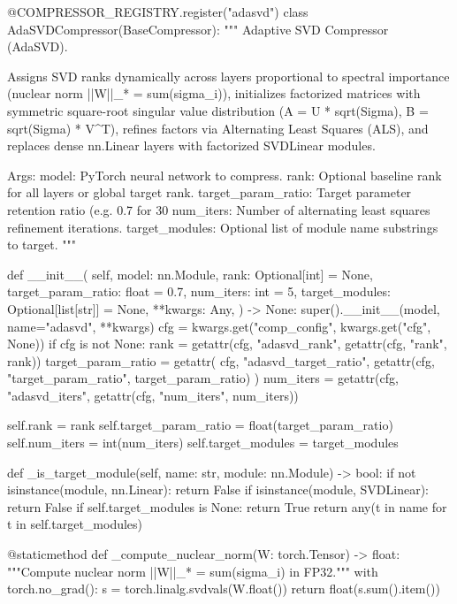 @COMPRESSOR\_REGISTRY.register("adasvd")
class AdaSVDCompressor(BaseCompressor):
    """
    Adaptive SVD Compressor (AdaSVD).

    Assigns SVD ranks dynamically across layers proportional to spectral importance
    (nuclear norm ||W||\_* = sum(sigma\_i)), initializes factorized matrices with
    symmetric square-root singular value distribution (A = U * sqrt(Sigma), B = sqrt(Sigma) * V^T),
    refines factors via Alternating Least Squares (ALS), and replaces dense nn.Linear layers
    with factorized SVDLinear modules.

    Args:
        model: PyTorch neural network to compress.
        rank: Optional baseline rank for all layers or global target rank.
        target\_param\_ratio: Target parameter retention ratio (e.g. 0.7 for 30%
        num\_iters: Number of alternating least squares refinement iterations.
        target\_modules: Optional list of module name substrings to target.
    """

    def \_\_init\_\_(
        self,
        model: nn.Module,
        rank: Optional[int] = None,
        target\_param\_ratio: float = 0.7,
        num\_iters: int = 5,
        target\_modules: Optional[list[str]] = None,
        **kwargs: Any,
    ) -> None:
        super().\_\_init\_\_(model, name="adasvd", **kwargs)
        cfg = kwargs.get("comp\_config", kwargs.get("cfg", None))
        if cfg is not None:
            rank = getattr(cfg, "adasvd\_rank", getattr(cfg, "rank", rank))
            target\_param\_ratio = getattr(
                cfg, "adasvd\_target\_ratio", getattr(cfg, "target\_param\_ratio", target\_param\_ratio)
            )
            num\_iters = getattr(cfg, "adasvd\_iters", getattr(cfg, "num\_iters", num\_iters))

        self.rank = rank
        self.target\_param\_ratio = float(target\_param\_ratio)
        self.num\_iters = int(num\_iters)
        self.target\_modules = target\_modules

    def \_is\_target\_module(self, name: str, module: nn.Module) -> bool:
        if not isinstance(module, nn.Linear):
            return False
        if isinstance(module, SVDLinear):
            return False
        if self.target\_modules is None:
            return True
        return any(t in name for t in self.target\_modules)

    @staticmethod
    def \_compute\_nuclear\_norm(W: torch.Tensor) -> float:
        """Compute nuclear norm ||W||\_* = sum(sigma\_i) in FP32."""
        with torch.no\_grad():
            s = torch.linalg.svdvals(W.float())
            return float(s.sum().item())

